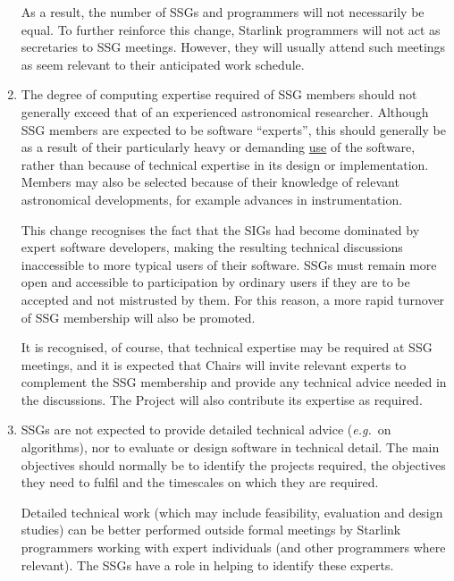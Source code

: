 \documentclass[twoside,11pt]{article}
\newcommand{\st}[1]{{\em{#1}}}
\newcommand{\qt}[1]{``#1''}
\newcommand{\qt}[1]{{\tt{"}}#1{\tt{"}}}
\begin{document}
\begin{enumerate}
As a result, the number of SSGs and programmers will not necessarily
be equal. To further reinforce this change, Starlink programmers will
not act as secretaries to SSG meetings. However, they will usually
attend such meetings as seem relevant to their anticipated work
schedule.

\item The degree of computing expertise required of SSG members should
not generally exceed that of an experienced astronomical
researcher. Although SSG members are expected to be software
\qt{experts}, this should generally be as a result of their
particularly heavy or demanding \underline{use} of the software,
rather than because of technical expertise in its design or
implementation. Members may also be selected because of their
knowledge of relevant astronomical developments, for example advances
in instrumentation.

This change recognises the fact that the SIGs had become dominated by
expert software developers, making the resulting technical discussions
inaccessible to more typical users of their software. SSGs must remain
more open and accessible to participation by ordinary users if they
are to be accepted and not mistrusted by them. For this reason, a more
rapid turnover of SSG membership will also be promoted.

It is recognised, of course, that technical expertise may be required
at SSG meetings, and it is expected that Chairs will invite relevant
experts to complement the SSG membership and provide any technical
advice needed in the discussions. The Project will also contribute its
expertise as required.

\item SSGs are not expected to provide detailed technical advice
(\st{e.g.}\ on algorithms), nor to evaluate or design software in
technical detail. The main objectives should normally be to identify
the projects required, the objectives they need to fulfil and the
timescales on which they are required.

Detailed technical work (which may include feasibility, evaluation and
design studies) can be better performed outside formal meetings by
Starlink programmers working with expert individuals (and other
programmers where relevant). The SSGs have a role in helping to
identify these experts.

\end{enumerate}
\end{document}

